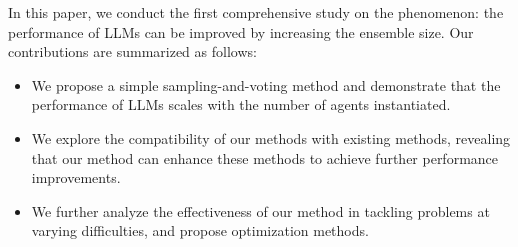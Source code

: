 In this paper, we conduct the first comprehensive study on the phenomenon: the performance of LLMs can be improved by increasing the ensemble size.
Our contributions are summarized as follows:

\begin{itemize}
\item  We propose a simple sampling-and-voting method and demonstrate that the performance of LLMs scales with the number of agents instantiated.
\item We explore the compatibility of our methods with existing methods, revealing that our method can enhance these methods to achieve further performance improvements.
\item We further analyze the effectiveness of our method in tackling problems at varying difficulties, and propose optimization methods.

\end{itemize}



